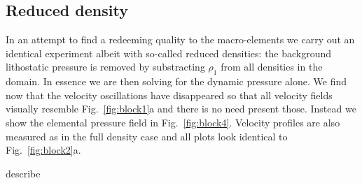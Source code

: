 \documentclass[a4paper,12pt]{article}
\begin{document}
\subsection{Reduced density}

In an attempt to find a redeeming quality to the macro-elements 
we carry out an identical experiment albeit with so-called reduced densities:
the background lithostatic pressure is removed by substracting $\rho_1$
from all densities in the domain. In essence we are then solving for the dynamic
pressure alone. 
We find now that the velocity oscillations have disappeared 
so that all velocity fields visually resemble Fig.~\ref{fig:block1}a and 
there is no need present those. Instead we show the elemental pressure field in Fig.~\ref{fig:block4}.
Velocity profiles are also measured as in the full density case and 
all plots look identical to Fig.~\ref{fig:block2}a.

{\color{red} describe}
\end{document}
